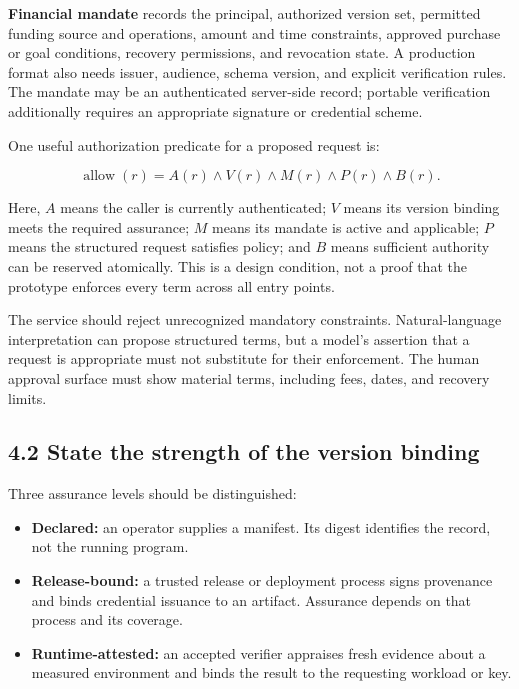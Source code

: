 \documentclass[
  11pt,
  letterpaper,
]{article}
\providecommand{\tightlist}{%
  \setlength{\itemsep}{0pt}\setlength{\parskip}{0pt}}
\begin{document}
\textbf{Financial mandate} records the principal, authorized version
set, permitted funding source and operations, amount and time
constraints, approved purchase or goal conditions, recovery permissions,
and revocation state. A production format also needs issuer, audience,
schema version, and explicit verification rules. The mandate may be an
authenticated server-side record; portable verification additionally
requires an appropriate signature or credential scheme.

One useful authorization predicate for a proposed request is:

\[
\operatorname{allow}(r) = A(r) \land V(r) \land M(r)
                         \land P(r) \land B(r).
\]

Here, \(A\) means the caller is currently authenticated; \(V\) means its
version binding meets the required assurance; \(M\) means its mandate is
active and applicable; \(P\) means the structured request satisfies
policy; and \(B\) means sufficient authority can be reserved atomically.
This is a design condition, not a proof that the prototype enforces
every term across all entry points.

The service should reject unrecognized mandatory constraints.
Natural-language interpretation can propose structured terms, but a
model's assertion that a request is appropriate must not substitute for
their enforcement. The human approval surface must show material terms,
including fees, dates, and recovery limits.

\subsection{4.2 State the strength of the version
binding}\label{state-the-strength-of-the-version-binding}

Three assurance levels should be distinguished:

\begin{itemize}
\tightlist
\item
  \textbf{Declared:} an operator supplies a manifest. Its digest
  identifies the record, not the running program.
\item
  \textbf{Release-bound:} a trusted release or deployment process signs
  provenance and binds credential issuance to an artifact. Assurance
  depends on that process and its coverage.
\item
  \textbf{Runtime-attested:} an accepted verifier appraises fresh
  evidence about a measured environment and binds the result to the
  requesting workload or key.
\end{itemize}
\end{document}
